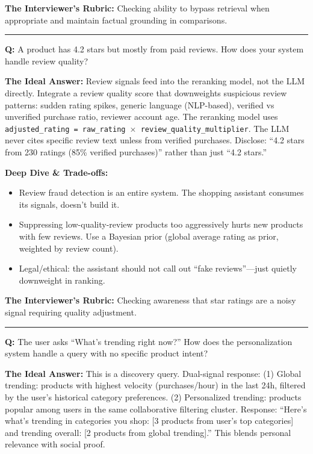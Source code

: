 \textbf{The Interviewer's Rubric:} Checking ability to bypass retrieval when appropriate and maintain factual grounding in comparisons.

\bigskip\hrule\bigskip

\textbf{Q:} A product has 4.2 stars but mostly from paid reviews. How does your system handle review quality?

\textbf{The Ideal Answer:} Review signals feed into the reranking model, not the LLM directly. Integrate a review quality score that downweights suspicious review patterns: sudden rating spikes, generic language (NLP-based), verified vs unverified purchase ratio, reviewer account age. The reranking model uses \texttt{adjusted\_rating = raw\_rating $\times$ review\_quality\_multiplier}. The LLM never cites specific review text unless from verified purchases. Disclose: ``4.2 stars from 230 ratings (85\% verified purchases)'' rather than just ``4.2 stars.''

\textbf{Deep Dive \& Trade-offs:}
\begin{itemize}
  \item Review fraud detection is an entire system. The shopping assistant consumes its signals, doesn't build it.
  \item Suppressing low-quality-review products too aggressively hurts new products with few reviews. Use a Bayesian prior (global average rating as prior, weighted by review count).
  \item Legal/ethical: the assistant should not call out ``fake reviews''---just quietly downweight in ranking.
\end{itemize}

\textbf{The Interviewer's Rubric:} Checking awareness that star ratings are a noisy signal requiring quality adjustment.

\bigskip\hrule\bigskip

\textbf{Q:} The user asks ``What's trending right now?'' How does the personalization system handle a query with no specific product intent?

\textbf{The Ideal Answer:} This is a discovery query. Dual-signal response: (1) Global trending: products with highest velocity (purchases/hour) in the last 24h, filtered by the user's historical category preferences. (2) Personalized trending: products popular among users in the same collaborative filtering cluster. Response: ``Here's what's trending in categories you shop: [3 products from user's top categories] and trending overall: [2 products from global trending].'' This blends personal relevance with social proof.

